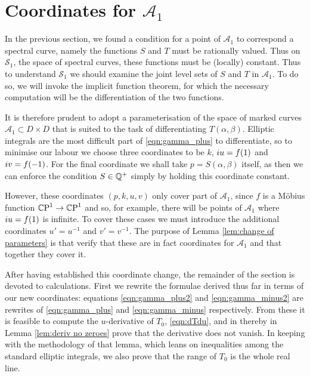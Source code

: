 \section{Coordinates for \texorpdfstring{$\mathcal{A}_1$}{A1}}
\label{sec:Reformulate}

In the previous section, we found a condition for a point of $\mathcal{A}_1$ to correspond a spectral curve, namely the functions $S$ and $T$ must be rationally valued. Thus on $\mathcal{S}_1$, the space of spectral curves, these functions must be (locally) constant. Thus to understand $\mathcal{S}_1$ we should examine the joint level sets of $S$ and $T$ in $\mathcal{A}_1$. To do so, we will invoke the implicit function theorem, for which the necessary computation will be the differentiation of the two functions.

It is therefore prudent to adopt a parameterisation of the space of marked curves $\mathcal{A}_1 \subset D\times D$ that is suited to the task of differentiating $T(α,β)$.
Elliptic integrals are the most difficult part of \eqref{eqn:gamma_plus} to differentiate, so to minimise our labour we choose three coordinates to be $k$, $i u = f(1)$ and $i v = f(-1)$. For the final coordinate we shall take $p=S(α,β)$ itself, as then we can enforce the condition $S\in\Q^+$ simply by holding this coordinate constant.

However, these coordinates $(p,k,u,v)$ only cover part of $\mathcal{A}_1$, since $f$ is a Möbius function $\CP^1 \to \CP^1$ and so, for example, there will be points of $\mathcal{A}_1$ where $i u = f(1)$ is infinite. To cover these cases we must introduce the additional coordinates $u' = u^{-1}$ and $v' = v^{-1}$. The purpose of Lemma \ref{lem:change of parameters} is that verify that these are in fact coordinates for $\mathcal{A}_1$ and that together they cover it.

After having established this coordinate change, the remainder of the section is devoted to calculations. First we rewrite the formulae derived thus far in terms of our new coordinates: equations \eqref{eqn:gamma_plus2} and \eqref{eqn:gamma_minus2} are rewrites of \eqref{eqn:gamma_plus} and \eqref{eqn:gamma_minus} respectively. From these it is feasible to compute the $u$-derivative of $T_0$, \eqref{eqn:dTdu}, and in thereby in Lemma \ref{lem:deriv no zeroes} prove that the derivative does not vanish. In keeping with the methodology of that lemma, which leans on inequalities among the standard elliptic integrals, we also prove that the range of $T_0$ is the whole real line.

